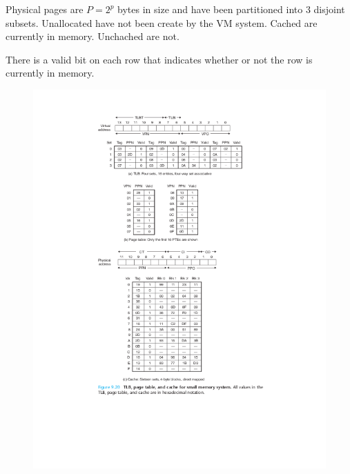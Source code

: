     Physical pages are $P=2^p$ bytes in size and have been partitioned into 3 disjoint subsets. Unallocated have not been create by the VM system. Cached are currently in memory. Unchached are not.

    There is a valid bit on each row that indicates whether or not the row is currently in memory.

    \begin{figure}[ht]
        \centering
        \includegraphics[scale=0.8]{./img/addresses.png}
    \end{figure}

